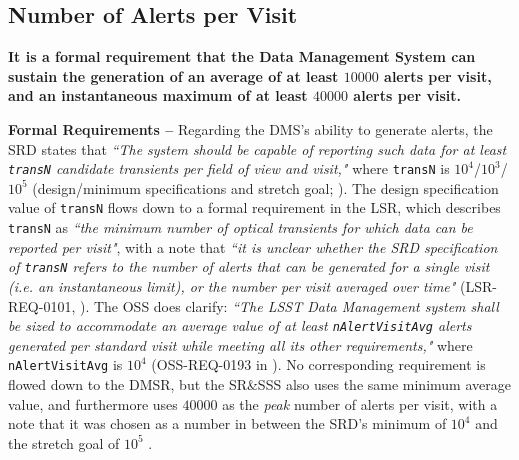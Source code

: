 \documentclass[DM,authoryear,toc]{lsstdoc}
\begin{document}


\subsection{Number of Alerts per Visit}\label{ssec:transN}

{\bf It is a formal requirement that the Data Management System can sustain the generation of an average of at least $10000$ alerts per visit, and an instantaneous maximum of at least $40000$ alerts per visit.}

{\bf Formal Requirements --} Regarding the DMS's ability to generate alerts, the SRD states that {\it ``The system should be capable of reporting such data for at least {\tt transN} candidate transients per field of view and visit,"} where {\tt transN} is $10^4$/$10^3$/$10^5$ (design/minimum specifications and stretch goal; ). The design specification value of {\tt transN} flows down to a formal requirement in the LSR, which describes {\tt transN} as {\it ``the minimum number of optical transients for which data can be reported per visit"}, with a note that {\it ``it is unclear whether the SRD specification of {\tt transN} refers to the number of alerts that can be generated for a single visit (i.e. an instantaneous limit), or the number per visit averaged over time"} (LSR-REQ-0101, ). The OSS does clarify: {\it ``The LSST Data Management system shall be sized to accommodate an average value of at least {\tt nAlertVisitAvg} alerts generated per standard visit while meeting all its other requirements,"} where {\tt nAlertVisitAvg} is $10^4$ (OSS-REQ-0193 in ). No corresponding requirement is flowed down to the DMSR, but the SR\&SSS also uses the same minimum average value, and furthermore uses $40000$ as the {\it peak} number of alerts per visit, with a note that it was chosen as a number in between the SRD's minimum of $10^4$ and the stretch goal of $10^5$ .
\end{document}
